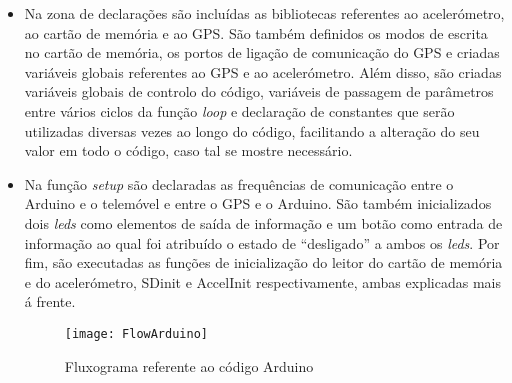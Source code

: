 \begin{itemize}
\item Na zona de declarações são incluídas as bibliotecas referentes ao acelerómetro, ao cartão de memória e ao GPS.
São também definidos os modos de escrita no cartão de memória, os portos de ligação de comunicação do GPS e criadas variáveis globais referentes ao GPS e ao acelerómetro.
Além disso, são criadas variáveis globais de controlo do código, variáveis de passagem de parâmetros entre vários ciclos da função \emph{loop} e declaração de constantes que serão utilizadas diversas vezes ao longo do código, facilitando a alteração do seu valor em todo o código, caso tal se mostre necessário.

\item Na função \emph{setup} são declaradas as frequências de comunicação entre o Arduino e o telemóvel e entre o GPS e o Arduino.
São também inicializados dois \emph{leds} como elementos de saída de informação e um botão como entrada de informação ao qual foi atribuído o estado de “desligado” a ambos os \emph{leds}.
Por fim, são executadas as funções de inicialização do leitor do cartão de memória e do acelerómetro, SD\textunderscore init e AccelInit respectivamente, ambas explicadas mais á frente.

\begin{figure}[hbtp]
	\centering
	\texttt{[image: FlowArduino]}
	\caption{Fluxograma referente ao código Arduino}
	\label{fig:Fluxograma_referente_ao_código_arduino}
\end{figure}


\end{itemize}
